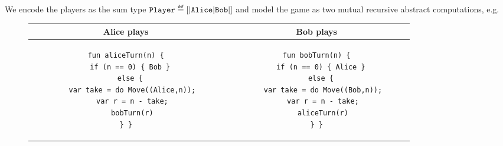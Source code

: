 We encode the players as the sum type $\type{Player} \defas [|\code{Alice}|\code{Bob}|]$ and model the game as two mutual recursive abstract computations, e.g.
\begin{figure*}[h]
  \centering
  \begin{tabular}{ c | c }
Alice plays & Bob plays \\
\hline
    \begin{subfigure}[c]{0.51\linewidth}
\begin{lstlisting}[style=links]
fun aliceTurn(n) {
  if (n == 0) { Bob }
  else {
   var take = do Move((Alice,n));
   var r = n - take;
   bobTurn(r)
} }
\end{lstlisting}
    \end{subfigure}
     &
    \begin{subfigure}[c]{0.49\linewidth}
\begin{lstlisting}[style=links]
fun bobTurn(n) {
  if (n == 0) { Alice }
  else {
   var take = do Move((Bob,n));
   var r = n - take;
   aliceTurn(r)
} }
\end{lstlisting}
    \end{subfigure}
\end{tabular}
\end{figure*}

